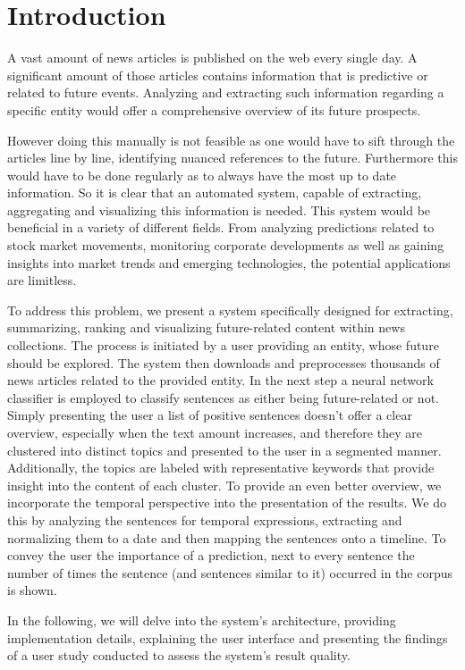 \documentclass[sigconf]{acmart}
\begin{document}
\section{Introduction}
A vast amount of news articles is published on the web every single day. A significant amount of those articles contains information that is predictive or related to future events. Analyzing and extracting such information regarding a specific entity would offer a comprehensive overview of its future prospects.

\noindent However doing this manually is not feasible as one would have to sift through the articles line by line, identifying nuanced references to the future. Furthermore this would have to be done regularly as to always have the most up to date information. So it is clear that an automated system, capable of extracting, aggregating and visualizing this information is needed. This system would be beneficial in a variety of different fields. From analyzing predictions related to stock market movements, monitoring corporate developments as well as gaining insights into market trends and emerging technologies, the potential applications are limitless.

\noindent To address this problem, we present a system specifically designed for extracting, summarizing, ranking and visualizing future-related content within news collections. The process is initiated by a user providing an entity, whose future should be explored. The system then downloads and preprocesses thousands of news articles related to the provided entity. In the next step a neural network classifier is employed to classify sentences as either being future-related or not. Simply presenting the user a list of positive sentences doesn't offer a clear overview, especially when the text amount increases, and therefore they are clustered into distinct topics and presented to the user in a segmented manner. Additionally, the topics are labeled with representative keywords that provide insight into the content of each cluster. To provide an even better overview, we incorporate the temporal perspective into the presentation of the results. We do this by analyzing the sentences for temporal expressions, extracting and normalizing them to a date and then mapping the sentences onto a timeline. To convey the user the importance of a prediction, next to every sentence the number of times the sentence (and sentences similar to it) occurred in the corpus is shown.

\noindent In the following, we will delve into the system's architecture, providing implementation details, explaining the user interface and presenting the findings of a user study conducted to assess the system's result quality.
\end{document}
